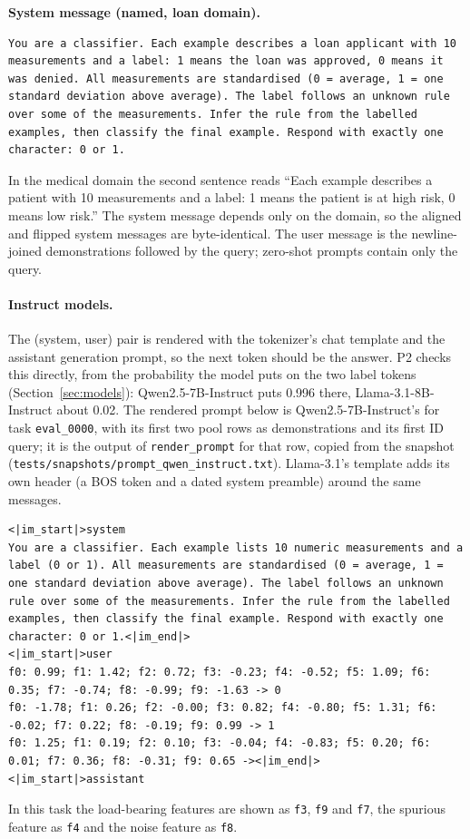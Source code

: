 \documentclass[11pt,a4paper]{article}
\newcommand{\1}{\mathbf{1}}
\theoremstyle{plain}
\theoremstyle{definition}
\theoremstyle{remark}
\begin{document}
\medskip\noindent\textbf{System message (named, loan domain).}
\begin{lstlisting}
You are a classifier. Each example describes a loan applicant with 10 measurements and a label: 1 means the loan was approved, 0 means it was denied. All measurements are standardised (0 = average, 1 = one standard deviation above average). The label follows an unknown rule over some of the measurements. Infer the rule from the labelled examples, then classify the final example. Respond with exactly one character: 0 or 1.
\end{lstlisting}

In the medical domain the second sentence reads ``Each example describes a
patient with 10 measurements and a label: 1 means the patient is at high
risk, 0 means low risk.'' The system message depends only on the domain, so
the aligned and flipped system messages are byte-identical. The user message
is the newline-joined demonstrations followed by the query; zero-shot
prompts contain only the query.

\paragraph{Instruct models.} The (system, user) pair is rendered with the
tokenizer's chat template and the assistant generation prompt, so the next
token should be the answer. P2 checks this directly, from the probability the
model puts on the two label tokens (Section~\ref{sec:models}):
Qwen2.5-7B-Instruct puts 0.996 there, Llama-3.1-8B-Instruct about 0.02. The rendered prompt below is Qwen2.5-7B-Instruct's for
task \texttt{eval\_0000}, with its first two pool rows as demonstrations and
its first ID query; it is the output of \texttt{render\_prompt} for that row,
copied from the snapshot (\texttt{tests/snapshots/prompt\_qwen\_instruct.txt}).
Llama-3.1's template adds its own header (a BOS token and a dated system
preamble) around the same messages.
\begin{lstlisting}
<|im_start|>system
You are a classifier. Each example lists 10 numeric measurements and a label (0 or 1). All measurements are standardised (0 = average, 1 = one standard deviation above average). The label follows an unknown rule over some of the measurements. Infer the rule from the labelled examples, then classify the final example. Respond with exactly one character: 0 or 1.<|im_end|>
<|im_start|>user
f0: 0.99; f1: 1.42; f2: 0.72; f3: -0.23; f4: -0.52; f5: 1.09; f6: 0.35; f7: -0.74; f8: -0.99; f9: -1.63 -> 0
f0: -1.78; f1: 0.26; f2: -0.00; f3: 0.82; f4: -0.80; f5: 1.31; f6: -0.02; f7: 0.22; f8: -0.19; f9: 0.99 -> 1
f0: 1.25; f1: 0.19; f2: 0.10; f3: -0.04; f4: -0.83; f5: 0.20; f6: 0.01; f7: 0.36; f8: -0.31; f9: 0.65 -><|im_end|>
<|im_start|>assistant
\end{lstlisting}
In this task the load-bearing features are shown as \texttt{f3}, \texttt{f9}
and \texttt{f7}, the spurious feature as \texttt{f4} and the noise feature as
\texttt{f8}.
\end{document}
